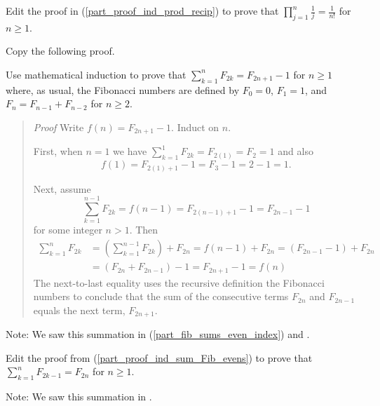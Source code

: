 \begin{act}
\begin{actpart}
        \item Edit the proof in (\ref{part_proof_ind_prod_recip}) to prove that $\displaystyle \prod_{j=1}^n \frac{1}{j} = \frac{1}{n!}$ for $n\ge1$.

        \item \label{part_proof_ind_sum_Fib_evens} Copy the following proof.

        Use mathematical induction to prove that $\displaystyle \sum_{k=1}^nF_{2k}=F_{2n+1}-1$  for $n \ge 1$ where, as usual, the Fibonacci numbers are defined by $F_0=0$, $F_1=1$, and $F_n=F_{n-1} + F_{n-2}$ for $n \ge 2$.

            \begin{quote} 
                \emph{Proof} Write $f(n) = F_{2n+1}-1$.  Induct on $n$.

                First, when $n=1$ we have $\displaystyle\sum_{k=1}^1F_{2k}=F_{2(1)}=F_2=1$ and also $$f(1) = F_{2(1)+1}-1=F_3-1=2-1=1.$$
            
                Next, assume    
                    $$\sum_{k=1}^{n-1}F_{2k} = f(n-1) = F_{2(n-1)+1}-1 = F_{2n-1}-1$$
                for some integer $n > 1$.
                Then
                    \begin{align*}
                        \sum_{k=1}^nF_{2k} & = \left( \sum_{k=1}^{n-1}F_{2k} \right) + F_{2n} 
                        = f(n-1) + F_{2n}  
                        = \left(F_{2n-1}-1\right)+F_{2n} \\
                        & = \left(F_{2n} + F_{2n-1}\right) -1 = F_{2n+1}-1 = f(n)
                    \end{align*}
                The next-to-last equality uses the recursive definition the Fibonacci numbers to conclude that the sum of the consecutive terms $F_{2n}$ and $F_{2n-1}$ equals the next term, $F_{2n+1}.$  
            \end{quote}
                
            Note: We saw this summation in  (\ref{part_fib_sums_even_index}) and .

            \item Edit the proof from (\ref{part_proof_ind_sum_Fib_evens}) to prove that $\displaystyle \sum_{k=1}^{n}F_{2k-1} = F_{2n}$ for $n \ge 1$. 
            
            Note: We saw this summation in   . 
    \end{actpart}
\end{act}

